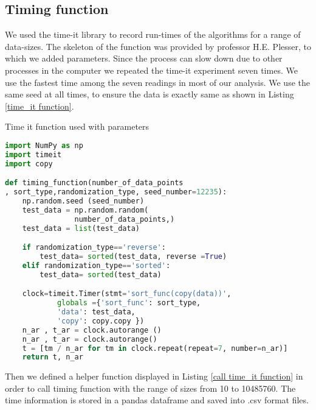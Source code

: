 \documentclass[sigconf, nonacm, natbib, screen, balance=False]{acmart}
\begin{document}
\subsection{Timing function}\label{sec:timing function}

We used the time-it library to record run-times of the algorithms for a range of data-sizes. The skeleton of the function was provided by professor H.E. Plesser, to which we added parameters. Since the process can slow down due to other processes in the computer we repeated the time-it experiment seven times. We use the fastest time among the seven readings in most of our analysis. We use the same seed at all times, to ensure the data is exactly same as shown in Listing \ref{time_it function}.

\begin{listing}
  \caption{Time it function used with parameters}
  \label{time_it function}
\begin{lstlisting}[language=Python]
import NumPy as np
import timeit
import copy

def timing_function(number_of_data_points
, sort_type,randomization_type, seed_number=12235):
    np.random.seed (seed_number)
    test_data = np.random.random(
                number_of_data_points,)
    test_data = list(test_data)

    if randomization_type=='reverse':
        test_data= sorted(test_data, reverse =True)
    elif randomization_type=='sorted':
        test_data= sorted(test_data)

    clock=timeit.Timer(stmt='sort_func(copy(data))',
            globals ={'sort_func': sort_type,
            'data': test_data,
            'copy': copy.copy })
    n_ar , t_ar = clock.autorange ()
    n_ar , t_ar = clock.autorange()
    t = [tm / n_ar for tm in clock.repeat(repeat=7, number=n_ar)]
    return t, n_ar
\end{lstlisting}
\end{listing}

Then we defined a helper function displayed in Listing  \ref{call time_it function} in order to call timing function with the range of sizes from 10 to 10485760. The time information is stored in a pandas dataframe and saved into .csv format files.
\end{document}

